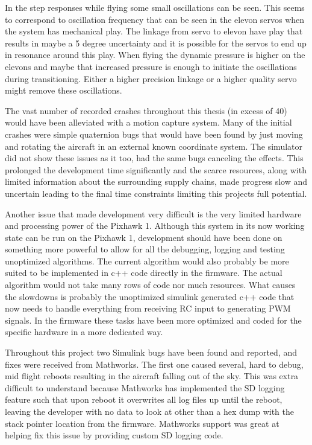 \documentclass{article}
\begin{document}
In the step responses while flying some small oscillations can be seen.
This seems to correspond to oscillation frequency that can be seen in the elevon servos when the system has mechanical play.
The linkage from servo to elevon have play that results in maybe a 5 degree uncertainty and it is possible for the servos to end up in resonance around this play.
When flying the dynamic pressure is higher on the elevons and maybe that increased pressure is enough to initiate the oscillations during transitioning.
Either a higher precision linkage or a higher quality servo might remove these oscillations.

The vast number of recorded crashes throughout this thesis (in excess of 40) would have been alleviated with a motion capture system.
Many of the initial crashes were simple quaternion bugs that would have been found by just moving and rotating the aircraft in an external known coordinate system.
The simulator did not show these issues as it too, had the same bugs canceling the effects.
This prolonged the development time significantly and the scarce resources, along with limited information about the surrounding supply chains, made progress slow and uncertain leading to the final time constraints limiting this projects full potential.

Another issue that made development very difficult is the very limited hardware and processing power of the Pixhawk 1.
Although this system in its now working state can be run on the Pixhawk 1, development should have been done on something more powerful to allow for all the debugging, logging and testing unoptimized algorithms.
The current algorithm would also probably be more suited to be implemented in c++ code directly in the firmware.
The actual algorithm would not take many rows of code nor much resources.
What causes the slowdowns is probably the unoptimized simulink generated c++ code that now needs to handle everything from receiving RC input to generating PWM signals.
In the firmware these tasks have been more optimized and coded for the specific hardware in a more dedicated way.

Throughout this project two Simulink bugs have been found and reported, and fixes were received from Mathworks.
The first one caused several, hard to debug, mid flight reboots resulting in the aircraft falling out of the sky.
This was extra difficult to understand because Mathworks has implemented the SD logging feature such that upon reboot it overwrites all log files up until the reboot, leaving the developer with no data to look at other than a hex dump with the stack pointer location from the firmware.
Mathworks support was great at helping fix this issue by providing custom SD logging code.
\end{document}
